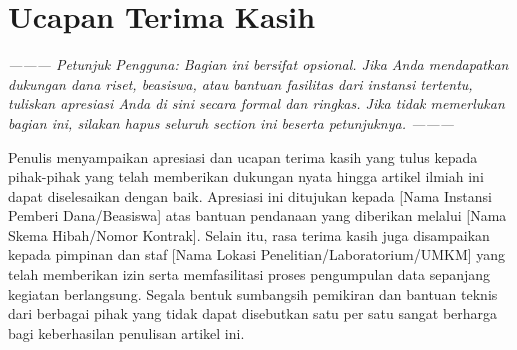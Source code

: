 \section*{Ucapan Terima Kasih}

\textit{--------- Petunjuk Pengguna: Bagian ini bersifat opsional. Jika Anda mendapatkan dukungan dana riset, beasiswa, atau bantuan fasilitas dari instansi tertentu, tuliskan apresiasi Anda di sini secara formal dan ringkas. Jika tidak memerlukan bagian ini, silakan hapus seluruh section ini beserta petunjuknya. ---------}

Penulis menyampaikan apresiasi dan ucapan terima kasih yang tulus kepada pihak-pihak yang telah memberikan dukungan nyata hingga artikel ilmiah ini dapat diselesaikan dengan baik. Apresiasi ini ditujukan kepada [Nama Instansi Pemberi Dana/Beasiswa] atas bantuan pendanaan yang diberikan melalui [Nama Skema Hibah/Nomor Kontrak]. Selain itu, rasa terima kasih juga disampaikan kepada pimpinan dan staf [Nama Lokasi Penelitian/Laboratorium/UMKM] yang telah memberikan izin serta memfasilitasi proses pengumpulan data sepanjang kegiatan berlangsung. Segala bentuk sumbangsih pemikiran dan bantuan teknis dari berbagai pihak yang tidak dapat disebutkan satu per satu sangat berharga bagi keberhasilan penulisan artikel ini.